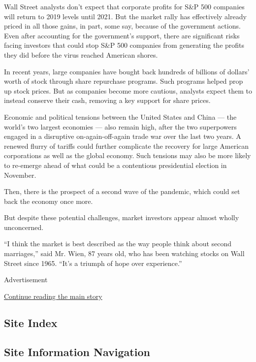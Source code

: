 Wall Street analysts don't expect that corporate profits for S\&P 500
companies will return to 2019 levels until 2021. But the market rally
has effectively already priced in all those gains, in part, some say,
because of the government actions. Even after accounting for the
government's support, there are significant risks facing investors that
could stop S\&P 500 companies from generating the profits they did
before the virus reached American shores.

In recent years, large companies have bought back hundreds of billions
of dollars' worth of stock through share repurchase programs. Such
programs helped prop up stock prices. But as companies become more
cautious, analysts expect them to instead conserve their cash, removing
a key support for share prices.

Economic and political tensions between the United States and China ---
the world's two largest economies --- also remain high, after the two
superpowers engaged in a disruptive on-again-off-again trade war over
the last two years. A renewed flurry of tariffs could further complicate
the recovery for large American corporations as well as the global
economy. Such tensions may also be more likely to re-emerge ahead of
what could be a contentious presidential election in November.

Then, there is the prospect of a second wave of the pandemic, which
could set back the economy once more.

But despite these potential challenges, market investors appear almost
wholly unconcerned.

``I think the market is best described as the way people think about
second marriages,'' said Mr. Wien, 87 years old, who has been watching
stocks on Wall Street since 1965. ``It's a triumph of hope over
experience.''

Advertisement

\protect\hyperlink{after-bottom}{Continue reading the main story}

\hypertarget{site-index}{%
\subsection{Site Index}\label{site-index}}

\hypertarget{site-information-navigation}{%
\subsection{Site Information
Navigation}\label{site-information-navigation}}

